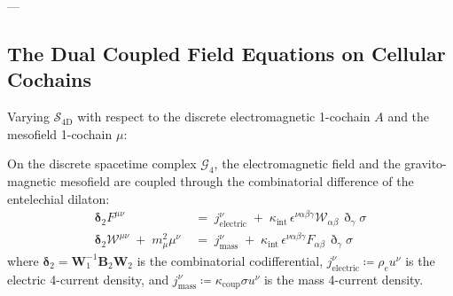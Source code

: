 \documentclass[
    12pt,
    a4paper,
    headings=normal,
    twoside=false,
    open=any,
    parskip=half
]{scrbook}
\newcommand{\ethop}{\eth}
\begin{document}
---

\subsection{The Dual Coupled Field Equations on Cellular Cochains}

Varying $\mathcal{S}_{4\text{D}}$ with respect to the discrete electromagnetic 1-cochain $A$ and the mesofield 1-cochain $\mu$:

\begin{phystheorem}\label{thm:ch6_coupled_proca_maxwell_equations}
On the discrete spacetime complex $\mathcal{G}_4$, the electromagnetic field and the gravito-magnetic mesofield are coupled through the combinatorial difference of the entelechial dilaton:
\begin{align}
\boldsymbol{\delta}_2 F^{\mu\nu} &\;=\; j_{\text{electric}}^\nu \;+\; \kappa_{\text{int}} \, \epsilon^{\nu\alpha\beta\gamma} \mathcal{W}_{\alpha\beta} \, \ethop_\gamma \sigma \label{eq:ch6_maxwell_inhomogeneous} \\
\boldsymbol{\delta}_2 \mathcal{W}^{\mu\nu} \;+\; m_\mu^2 \mu^\nu &\;=\; j_{\text{mass}}^\nu \;+\; \kappa_{\text{int}} \, \epsilon^{\nu\alpha\beta\gamma} F_{\alpha\beta} \, \ethop_\gamma \sigma \label{eq:ch6_proca_inhomogeneous}
\end{align}
where $\boldsymbol{\delta}_2 = \mathbf{W}_1^{-1} \mathbf{B}_2 \mathbf{W}_2$ is the combinatorial codifferential, $j_{\text{electric}}^\nu \coloneqq \rho_e u^\nu$ is the electric 4-current density, and $j_{\text{mass}}^\nu \coloneqq \kappa_{\text{coup}} \sigma u^\nu$ is the mass 4-current density.
\end{phystheorem}
\end{document}

